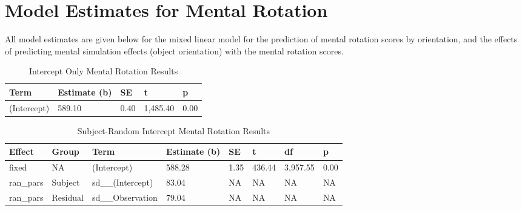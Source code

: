 \documentclass[
  man,floatsintext]{apa7}
\begin{document}
\hypertarget{model-estimates-for-mental-rotation}{%
\section{Model Estimates for Mental Rotation}\label{model-estimates-for-mental-rotation}}

All model estimates are given below for the mixed linear model for the prediction of mental rotation scores by orientation, and the effects of predicting mental simulation effects (object orientation) with the mental rotation scores.

\newpage

\begin{table}[tbp]

\begin{center}
\begin{threeparttable}

\caption{\label{tab:intercept_e}Intercept Only Mental Rotation Results}

\begin{tabular}{lllll}
\toprule
Term & Estimate (b) & SE & t & p\\
\midrule
(Intercept) & 589.10 & 0.40 & 1,485.40 & 0.00\\
\bottomrule
\end{tabular}

\end{threeparttable}
\end{center}

\end{table}

\begin{table}[tbp]

\begin{center}
\begin{threeparttable}

\caption{\label{tab:subject_e}Subject-Random Intercept Mental Rotation Results}

\begin{tabular}{llllllll}
\toprule
Effect & Group & Term & Estimate (b) & SE & t & df & p\\
\midrule
fixed & NA & (Intercept) & 588.28 & 1.35 & 436.44 & 3,957.55 & 0.00\\
ran\_pars & Subject & sd\_\_(Intercept) & 83.04 & NA & NA & NA & NA\\
ran\_pars & Residual & sd\_\_Observation & 79.04 & NA & NA & NA & NA\\
\bottomrule
\end{tabular}

\end{threeparttable}
\end{center}

\end{table}
\end{document}
